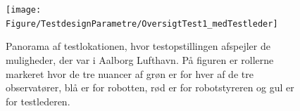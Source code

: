 \newpage   
%
\begin{figure}[H]
\centering
\texttt{[image: Figure/TestdesignParametre/OversigtTest1\_medTestleder]} 
\caption{Panorama af testlokationen, hvor testopstillingen afspejler de muligheder, der var i Aalborg Lufthavn. På figuren er rollerne markeret hvor de tre nuancer af grøn er for hver af de tre observatører, blå er for robotten, rød er for robotstyreren og gul er for testlederen.}
\label{fig:ParametreTestopstilling}
\end{figure}
\noindent
\blankline
%  

